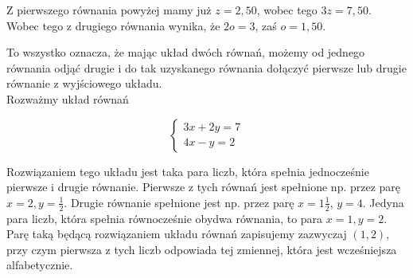 \documentclass[10pt]{article}
\begin{document}
Z pierwszego równania powyżej mamy już \(z=2,50\), wobec tego \(3 z=7,50\). Wobec tego z drugiego równania wynika, że \(2 o=3\), zaś \(o=1,50\).

To wszystko oznacza, że mając układ dwóch równań, możemy od jednego równania odjąć drugie i do tak uzyskanego równania dołączyć pierwsze lub drugie równanie z wyjściowego układu.\\
Rozważmy układ równań

\[
\left\{\begin{array}{l}
3 x+2 y=7 \\
4 x-y=2
\end{array}\right.
\]

Rozwiązaniem tego układu jest taka para liczb, która spełnia jednocześnie pierwsze i drugie równanie. Pierwsze z tych równań jest spełnione np. przez parę \(x=2, y=\frac{1}{2}\). Drugie równanie spełnione jest np. przez parę \(x=1 \frac{1}{2}\), \(y=4\). Jedyna para liczb, która spełnia równocześnie obydwa równania, to para \(x=1, y=2\). Parę taką będącą rozwiązaniem układu równań zapisujemy zazwyczaj \((1,2)\), przy czym pierwsza z tych liczb odpowiada tej zmiennej, która jest wcześniejsza alfabetycznie.
\end{document}

